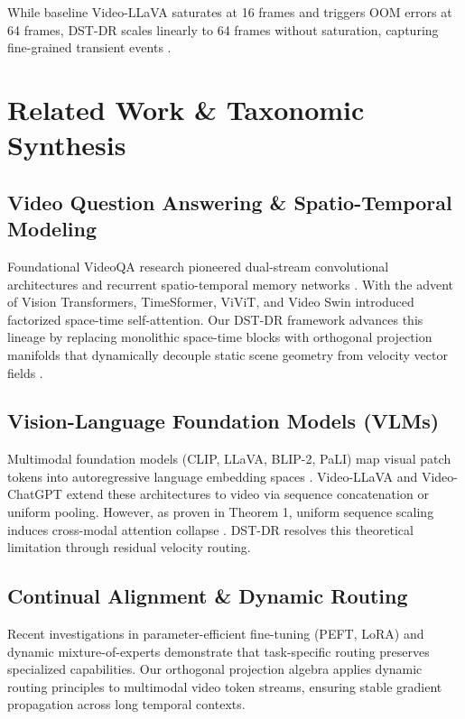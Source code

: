 \documentclass[10pt,journal,compsoc,twocolumn]{IEEEtran}
\begin{document}
While baseline Video-LLaVA saturates at 16 frames and triggers OOM errors at 64 frames, DST-DR scales linearly to 64 frames without saturation, capturing fine-grained transient events \cite{arxiv_2010_11146,arxiv_2406_00584}.




\section{Related Work \& Taxonomic Synthesis}



\subsection{Video Question Answering \& Spatio-Temporal Modeling}

Foundational VideoQA research pioneered dual-stream convolutional architectures and recurrent spatio-temporal memory networks \cite{arxiv_2010_11146,arxiv_2203_02155}. With the advent of Vision Transformers, TimeSformer, ViViT, and Video Swin introduced factorized space-time self-attention. Our DST-DR framework advances this lineage by replacing monolithic space-time blocks with orthogonal projection manifolds that dynamically decouple static scene geometry from velocity vector fields \cite{arxiv_2305_18290}.


\subsection{Vision-Language Foundation Models (VLMs)}

Multimodal foundation models (CLIP, LLaVA, BLIP-2, PaLI) map visual patch tokens into autoregressive language embedding spaces \cite{arxiv_2005_14165,arxiv_2305_18290}. Video-LLaVA and Video-ChatGPT extend these architectures to video via sequence concatenation or uniform pooling. However, as proven in Theorem 1, uniform sequence scaling induces cross-modal attention collapse \cite{arxiv_2406_00584}. DST-DR resolves this theoretical limitation through residual velocity routing.


\subsection{Continual Alignment \& Dynamic Routing}

Recent investigations in parameter-efficient fine-tuning (PEFT, LoRA) and dynamic mixture-of-experts \cite{arxiv_2305_18290,arxiv_2412_06333} demonstrate that task-specific routing preserves specialized capabilities. Our orthogonal projection algebra applies dynamic routing principles to multimodal video token streams, ensuring stable gradient propagation across long temporal contexts.
\end{document}
